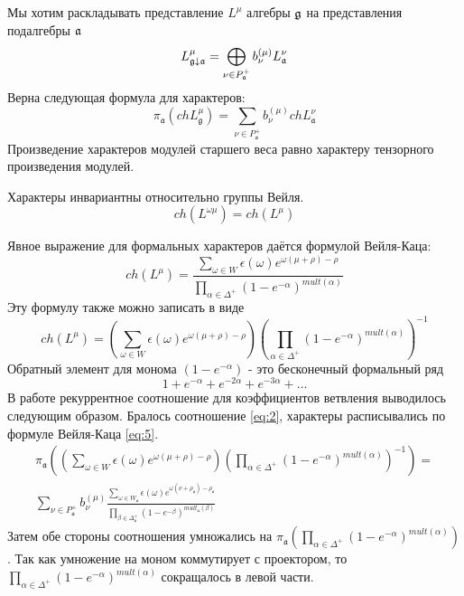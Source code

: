 \documentclass[a4paper,12pt]{article}
\theoremstyle{definition} \newtheorem{Def}{Definition}
\begin{document}
Мы хотим раскладывать представление $L^{\mu}$ алгебры
$\frak{g}$ на представления подалгебры $\frak{a}$
\begin{equation}
  \label{eq:1}
  L_{\frak{g}\downarrow \frak{a}}^{\mu }=\bigoplus\limits_{\nu \in P_{\frak{a}%
    }^{+}}b_{\nu }^{\left( \mu \right) }L_{\frak{a}}^{\nu }
\end{equation}
Верна следующая формула для характеров:
\begin{equation}
  \label{eq:2}
  \pi_{\mathfrak{a}}(ch L^{\mu}_{\mathfrak{g}})=\sum_{\nu\in P^{+}_{\mathfrak{a}}}b^{(\mu)}_{\nu} ch L^{\nu}_{\mathfrak{a}}
\end{equation}
Произведение характеров модулей старшего веса равно характеру тензорного произведения модулей.

Характеры инвариантны относительно группы Вейля.
\begin{equation}
  \label{eq:3}
  ch(L^{\omega\mu})=ch(L^{\mu})
\end{equation}

Явное выражение для формальных характеров даётся формулой Вейля-Каца:
\begin{equation}
  \label{eq:4}
  ch(L^{\mu})=\frac{\sum_{\omega\in W}\epsilon(\omega)e^{\omega(\mu+\rho)-\rho}}{\prod_{\alpha\in \Delta^{+}}(1-e^{-\alpha})^{mult(\alpha)}}
\end{equation}
Эту формулу также можно записать в виде
\begin{equation}
  \label{eq:5}
  ch(L^{\mu})=\left( \sum_{\omega\in W}\epsilon(\omega)e^{\omega(\mu+\rho)-\rho} \right) \left(\prod_{\alpha\in \Delta^{+}}(1-e^{-\alpha})^{mult(\alpha)}\right)^{-1}
\end{equation}
Обратный элемент для монома $(1-e^{-\alpha})$ - это бесконечный формальный ряд
\begin{equation}
  \label{eq:6}
  1+e^{-\alpha}+e^{-2\alpha}+e^{-3\alpha}+\dots
\end{equation}
В работе \cite{ilyin812pbc} рекуррентное соотношение для коэффициентов ветвления выводилось следующим образом.
Бралось соотношение \eqref{eq:2}, характеры расписывались по формуле Вейля-Каца \eqref{eq:5}.
\begin{multline}
  \label{eq:7}
  \pi_{\mathfrak{a}}\left(\left(\sum_{\omega\in W}\epsilon(\omega)e^{\omega(\mu+\rho)-\rho}\right) \left(\prod_{\alpha\in \Delta^{+}}(1-e^{-\alpha})^{mult(\alpha)}\right)^{-1}\right)= \\
  \sum_{\nu\in P^{+}_{\mathfrak{a}}}b^{(\mu)}_{\nu}
  \frac{\sum_{\omega\in W_{\mathfrak{a}}}\epsilon(\omega)e^{\omega(\nu+\rho_{\mathfrak{a}})-\rho_{\mathfrak{a}}}}{\prod_{\beta\in \Delta_{\mathfrak{a}}^{+}}(1-e^{-\beta})^{mult_{\mathfrak{a}}(\beta)}}
\end{multline}
Затем обе стороны соотношения умножались на $\pi_{\mathfrak{a}}\left(\prod_{\alpha\in \Delta^{+}}(1-e^{-\alpha})^{mult(\alpha)}\right)$. Так как умножение на моном коммутирует с проектором, то $\prod_{\alpha\in \Delta^{+}}(1-e^{-\alpha})^{mult(\alpha)}$ сокращалось в левой части.
\end{document}
